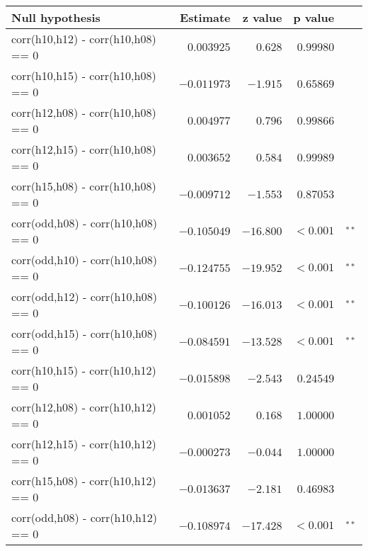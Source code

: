 \begin{table*}[t]\scriptsize
\caption{
Results from the post hoc pairwise comparisons of the linear mixed model built on the correlation data shown in \autoref{fig:corrERP}.
The first column represents the tested hypothesis; ``odd'' represents the oddball condition while ``h08'', ``h10'', ``h12'' and ``h15'' represent the hybrid condition at \SIlist[list-units = single]{8.57;10;12;15}{\Hz}.
Therefore ``corr(odd,h10)'' represents the correlation between oddball and \SI{10}{\Hz}-hybrid ERPs.
The first line of the table tests for significance in the difference between, on the one hand, correlation values between ERPs recorded in the oddball and in the \SI{10}{\Hz}-hybrid conditions and, on the other hand, correlation values between ERPs recorded in the oddball and in the \SI{8.57}{\Hz}-hybrid conditions.
The second column shows the estimate of the differences tested (reported in the first column), the third and fourth columns represent respectively the test statistic and the associated p-value.
the symbol $^{**}$ denotes statistical significance below 0.01.
}
\label{table:TukeyTable}
\centering
\begin{tabular}{l r r r l}
\toprule
Null hypothesis & Estimate & z value & p value & \tabularnewline
\toprule
corr(h10,h12) - corr(h10,h08)  == 0 & $  0.003925 $ & $   0.628 $ & $ 0.99980 $ & \tabularnewline
corr(h10,h15) - corr(h10,h08)  == 0 & $ -0.011973 $ & $  -1.915 $ & $ 0.65869 $ & \tabularnewline
corr(h12,h08) - corr(h10,h08)  == 0 & $  0.004977 $ & $   0.796 $ & $ 0.99866 $ & \tabularnewline
corr(h12,h15) - corr(h10,h08)  == 0 & $  0.003652 $ & $   0.584 $ & $ 0.99989 $ & \tabularnewline
corr(h15,h08) - corr(h10,h08)  == 0 & $ -0.009712 $ & $  -1.553 $ & $ 0.87053 $ & \tabularnewline
corr(odd,h08) - corr(h10,h08)  == 0 & $ -0.105049 $ & $ -16.800 $ & $< 0.001 $ & $^{**}$\tabularnewline
corr(odd,h10) - corr(h10,h08)  == 0 & $ -0.124755 $ & $ -19.952 $ & $< 0.001 $ & $^{**}$\tabularnewline
corr(odd,h12) - corr(h10,h08)  == 0 & $ -0.100126 $ & $ -16.013 $ & $< 0.001 $ & $^{**}$\tabularnewline
corr(odd,h15) - corr(h10,h08)  == 0 & $ -0.084591 $ & $ -13.528 $ & $< 0.001 $ & $^{**}$\tabularnewline
corr(h10,h15) - corr(h10,h12)  == 0 & $ -0.015898 $ & $  -2.543 $ & $ 0.24549 $ & \tabularnewline
corr(h12,h08) - corr(h10,h12)  == 0 & $  0.001052 $ & $   0.168 $ & $ 1.00000 $ & \tabularnewline
corr(h12,h15) - corr(h10,h12)  == 0 & $ -0.000273 $ & $  -0.044 $ & $ 1.00000 $ & \tabularnewline
corr(h15,h08) - corr(h10,h12)  == 0 & $ -0.013637 $ & $  -2.181 $ & $ 0.46983 $ & \tabularnewline
corr(odd,h08) - corr(h10,h12)  == 0 & $ -0.108974 $ & $ -17.428 $ & $< 0.001 $ & $^{**}$\tabularnewline

\end{tabular}
\end{table*}
